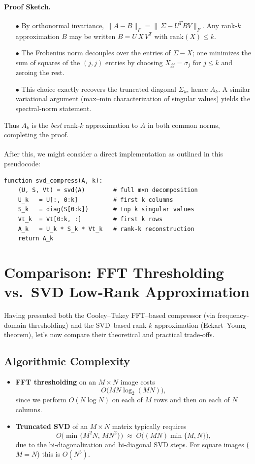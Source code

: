 \documentclass[12pt]{article}
\begin{document}
\paragraph{Proof Sketch.}
\begin{enumerate}
  \item[\(\bullet\)] By orthonormal invariance, \(\|A - B\|_F = \|\,\Sigma - U^TBV\|_F\).  Any rank-\(k\) approximation \(B\) may be written \(B=U\,X\,V^T\) with \(\mathrm{rank}(X)\le k\).  
  \item[\(\bullet\)] The Frobenius norm decouples over the entries of \(\Sigma - X\); one minimizes the sum of squares of the \((j,j)\) entries by choosing \(X_{jj}=\sigma_j\) for \(j\le k\) and zeroing the rest.
  \item[\(\bullet\)] This choice exactly recovers the truncated diagonal \(\Sigma_k\), hence \(A_k\).  A similar variational argument (max–min characterization of singular values) yields the spectral‐norm statement.
\end{enumerate}

\noindent Thus \(A_k\) is the \emph{best} rank‐\(k\) approximation to \(A\) in both common norms, completing the proof.
\\
\\
After this, we might consider a direct implementation as outlined in this pseudocode:
\begin{verbatim}
function svd_compress(A, k):
    (U, S, Vt) = svd(A)        # full m×n decomposition
    U_k   = U[:, 0:k]          # first k columns
    S_k   = diag(S[0:k])       # top k singular values
    Vt_k  = Vt[0:k, :]         # first k rows
    A_k   = U_k * S_k * Vt_k   # rank-k reconstruction
    return A_k
\end{verbatim}

\section{Comparison: FFT Thresholding vs.\ SVD Low‐Rank Approximation}
Having presented both the Cooley–Tukey FFT–based compressor (via frequency‐domain thresholding) and the SVD–based rank-$k$ approximation (Eckart–Young theorem), let's now compare their theoretical and practical trade-offs.

\subsection{Algorithmic Complexity}
\begin{itemize}
  \item \textbf{FFT thresholding} on an $M\times N$ image costs
  \[
    O\bigl(MN\log_2(MN)\bigr),
  \]
  \noindent since we perform $O(N\log N)$ on each of $M$ rows and then on each of $N$ columns.
  \item \textbf{Truncated SVD} of an $M\times N$ matrix typically requires
  \[
    O\bigl(\min\{M^2 N,\,M N^2\}\bigr)
    \;\approx\;
    O\bigl((MN)\min\{M,N\}\bigr),
  \]
  \noindent due to the bi-diagonalization and bi-diagonal SVD steps.  For square images ($M=N$) this is $O(N^3)$.
\end{itemize}
\end{document}
